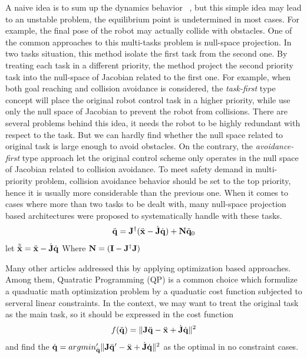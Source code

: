 A naive idea is to sum up the dynamics behavior ~\cite{Santis:2007:ASME}, but this simple idea may lead to an unstable problem, the equilibrium point is undetermined in most  cases. For example, the final pose of the robot may actually collide with obstacles.
One of the common approaches to this multi-tasks problem is null-space projection. In two tasks situation, this method isolate the first task from the second one. By treating each task in a different priority, the method project the second priority task  into the null-space of Jacobian related to the first one. 
For example, when both goal reaching and collision avoidance is considered, the \textit{task-first} type concept will place the  original robot control task in a higher priority, 
while use only the null space of Jacobian to prevent the robot from collisions. There are several problems behind this idea, it needs the robot to be highly redundant with 
respect to the task. But we can hardly find whether the null space related to original task is large enough to avoid obstacles. 
On the contrary, the \textit{avoidance-first} type approach let the original control scheme only operates in the null space of Jacobian related to collision avoidance. 
To meet safety demand in multi-priority problem, collision avoidance behavior should be set to the top priority, hence it is usually more considerable than the previous one. 
When it comes to cases where more than two tasks to be dealt with, many null-space projection based architectures were proposed to systematically handle with these tasks.
\begin{equation}
{\ddot{\mathbf{q}}} = {\mathbf{J}}^{\dagger} ({\ddot{\mathbf{x}}} - {\dot{\mathbf{J}}}{\dot{\mathbf{q}}})+ \mathbf{N} {\ddot{\mathbf{q}}}_0 
\end{equation}
let $\tilde{{\ddot{\mathbf{x}}}} = {\ddot{\mathbf{x}}} - {\dot{\mathbf{J}}}{\dot{\mathbf{q}}}$
Where $\mathbf{N} = (\mathbf{I} - {\mathbf{J}}^{\dagger} \mathbf{J})$

Many other articles  addressed  this by applying optimization based approaches. Among them, Quatratic Programming (QP) is a common choice which formulize a quaduatic math optimization 
problem by a quaduatic cost function subjected to serveral linear constraints. In the context, we may want to treat the original task as the main task, so it should be 
expressed in the cost function 
\begin{equation}
f({\ddot{\mathbf{q}}}) = \| \mathbf{J}{\ddot{\mathbf{q}}}  - {\ddot{\mathbf{x}}} + {\dot{\mathbf{J}}}{\dot{\mathbf{q}}}\|^2
\end{equation}
and find the ${\dot{\mathbf{q}}} = argmin_{\ddot{\mathbf{q}}}'\|\mathbf{J}{\ddot{\mathbf{q}}}' - {\ddot{\mathbf{x}}} + {\dot{\mathbf{J}}}{\dot{\mathbf{q}}}  \|^2$ as the optimal  in no constraint cases. 

